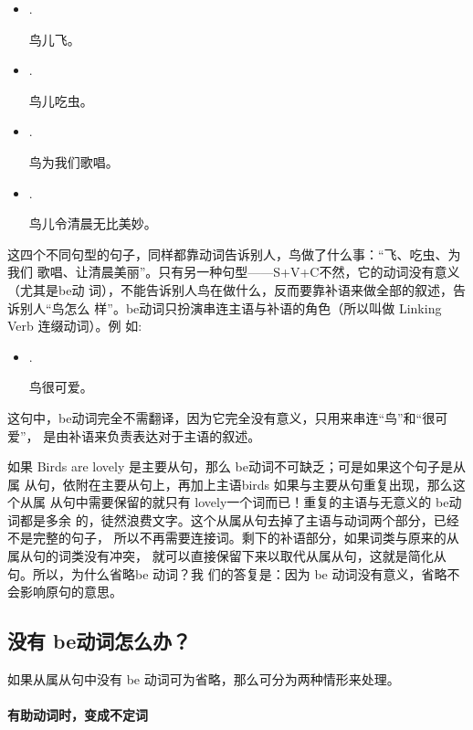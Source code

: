 \begin{itemize}
\item {} .

  鸟儿飞。
\item {}  .

  鸟儿吃虫。
\item {}   .

  鸟为我们歌唱。
\item {}   .

  鸟儿令清晨无比美妙。
\end{itemize}
这四个不同句型的句子，同样都靠动词告诉别人，鸟做了什么事：“飞、吃虫、为我们
歌唱、让清晨美丽”。只有另一种句型——S+V+C不然，它的动词没有意义（尤其是be动
词），不能告诉别人鸟在做什么，反而要靠补语来做全部的叙述，告诉别人“鸟怎么
样”。be动词只扮演串连主语与补语的角色（所以叫做 Linking Verb 连缀动词）。例
如:
\begin{itemize}
\item {}  .

  鸟很可爱。
\end{itemize}
这句中，be动词完全不需翻译，因为它完全没有意义，只用来串连“鸟”和“很可爱”，
是由补语来负责表达对于主语的叙述。

如果 Birds are lovely 是主要从句，那么 be动词不可缺乏；可是如果这个句子是从属
从句，依附在主要从句上，再加上主语birds 如果与主要从句重复出现，那么这个从属
从句中需要保留的就只有 lovely一个词而已！重复的主语与无意义的 be动词都是多余
的，徒然浪费文字。这个从属从句去掉了主语与动词两个部分，已经不是完整的句子，
所以不再需要连接词。剩下的补语部分，如果词类与原来的从属从句的词类没有冲突，
就可以直接保留下来以取代从属从句，这就是简化从句。所以，为什么省略be 动词？我
们的答复是：因为 be 动词没有意义，省略不会影响原句的意思。

\subsection{没有 be动词怎么办？}

如果从属从句中没有 be 动词可为省略，那么可分为两种情形来处理。

\paragraph{有助动词时，变成不定词}

